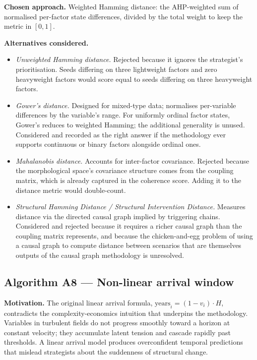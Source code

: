 \documentclass[11pt,a4paper]{article}
\begin{document}
\textbf{Chosen approach.} Weighted Hamming distance: the AHP-weighted sum of normalised per-factor state differences, divided by the total weight to keep the metric in $[0, 1]$.

\textbf{Alternatives considered.}

\begin{itemize}[leftmargin=*]
  \item \emph{Unweighted Hamming distance.} Rejected because it ignores the strategist's prioritisation. Seeds differing on three lightweight factors and zero heavyweight factors would score equal to seeds differing on three heavyweight factors.
  \item \emph{Gower's distance.} Designed for mixed-type data; normalises per-variable differences by the variable's range. For uniformly ordinal factor states, Gower's reduces to weighted Hamming; the additional generality is unused. Considered and recorded as the right answer if the methodology ever supports continuous or binary factors alongside ordinal ones.
  \item \emph{Mahalanobis distance.} Accounts for inter-factor covariance. Rejected because the morphological space's covariance structure comes from the coupling matrix, which is already captured in the coherence score. Adding it to the distance metric would double-count.
  \item \emph{Structural Hamming Distance / Structural Intervention Distance.} Measures distance via the directed causal graph implied by triggering chains. Considered and rejected because it requires a richer causal graph than the coupling matrix represents, and because the chicken-and-egg problem of using a causal graph to compute distance between scenarios that are themselves outputs of the causal graph methodology is unresolved.
\end{itemize}

\subsection{Algorithm A8 — Non-linear arrival window}

\textbf{Motivation.} The original linear arrival formula, $\text{years}_i = (1 - v_i) \cdot H$, contradicts the complexity-economics intuition that underpins the methodology. Variables in turbulent fields do not progress smoothly toward a horizon at constant velocity; they accumulate latent tension and cascade rapidly past thresholds. A linear arrival model produces overconfident temporal predictions that mislead strategists about the suddenness of structural change.
\end{document}
